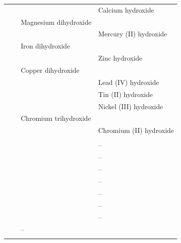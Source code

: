 \begin{landscape}
\begin{longtable}{@{}c C{2cm} C{12cm} C{12cm}@{}}
            \myorder{} & \rojo{\ch{}} & \rojo{} & Calcium hydroxide \\[3pt]
            \myorder{} & \rojo{\ch{}} & Magnesium dihydroxide & \rojo{} \\[3pt]
            \myorder{} & \rojo{\ch{}} & \rojo{} & Mercury (II) hydroxide \\[3pt]
            \myorder{} & \rojo{\ch{}} & Iron dihydroxide & \rojo{} \\[3pt]
            \myorder{} & \rojo{\ch{}} & \rojo{} & Zinc hydroxide \\[3pt]
            \myorder{} & \rojo{\ch{}} & Copper dihydroxide & \rojo{} \\[3pt]
            \myorder{} & \rojo{\ch{}} & \rojo{} & Lead (IV) hydroxide \\[3pt]
            \myorder{} & \rojo{\ch{}} & \rojo{} & Tin (II) hydroxide \\[3pt]
            \myorder{} & \rojo{\ch{}} & \rojo{} & Nickel (III) hydroxide \\[3pt]
            \myorder{} & \rojo{\ch{}} & Chromium trihydroxide & \rojo{} \\[3pt]
            \myorder{} & \rojo{\ch{}} & \rojo{} & Chromium (II) hydroxide \\[3pt]
             \\[3pt]
            \myorder{} &  & \rojo{} & -- \\[3pt]
            \myorder{} &  & \rojo{} & -- \\[3pt]
            \myorder{} &  & \rojo{} & -- \\[3pt]
            \myorder{} &  & \rojo{} & -- \\[3pt]
            \myorder{} &  & \rojo{} & -- \\[3pt]
            \myorder{} &  &  & -- \\[3pt]
            \myorder{} &  &  & -- \\[3pt]
            \myorder{} &  & -- \\[3pt]
             \\[3pt]

\end{longtable}
\end{landscape}
